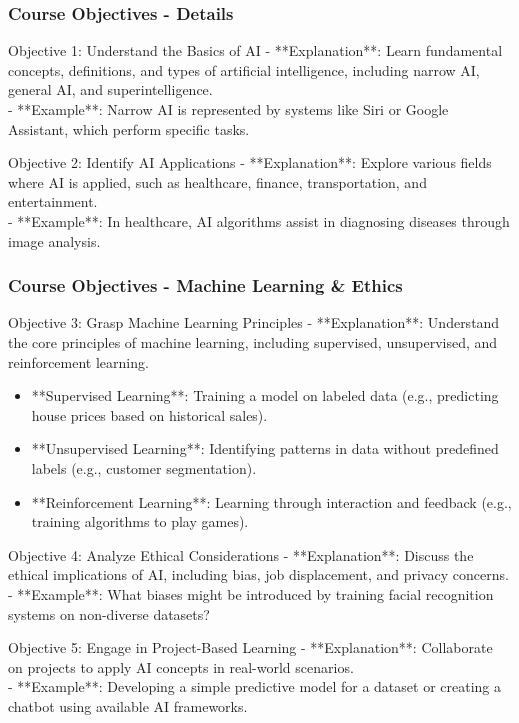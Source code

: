 \documentclass[aspectratio=169]{beamer}
\begin{document}
\begin{frame}[fragile]
    \frametitle{Course Objectives - Details}
    \begin{block}{Objective 1: Understand the Basics of AI}
        - **Explanation**: Learn fundamental concepts, definitions, and types of artificial intelligence, including narrow AI, general AI, and superintelligence. \\
        - **Example**: Narrow AI is represented by systems like Siri or Google Assistant, which perform specific tasks.
    \end{block}

    \begin{block}{Objective 2: Identify AI Applications}
        - **Explanation**: Explore various fields where AI is applied, such as healthcare, finance, transportation, and entertainment. \\
        - **Example**: In healthcare, AI algorithms assist in diagnosing diseases through image analysis.
    \end{block}
\end{frame}

\begin{frame}[fragile]
    \frametitle{Course Objectives - Machine Learning & Ethics}
    \begin{block}{Objective 3: Grasp Machine Learning Principles}
        - **Explanation**: Understand the core principles of machine learning, including supervised, unsupervised, and reinforcement learning. \\
        \begin{itemize}
            \item **Supervised Learning**: Training a model on labeled data (e.g., predicting house prices based on historical sales).
            \item **Unsupervised Learning**: Identifying patterns in data without predefined labels (e.g., customer segmentation).
            \item **Reinforcement Learning**: Learning through interaction and feedback (e.g., training algorithms to play games).
        \end{itemize}
    \end{block}

    \begin{block}{Objective 4: Analyze Ethical Considerations}
        - **Explanation**: Discuss the ethical implications of AI, including bias, job displacement, and privacy concerns. \\
        - **Example**: What biases might be introduced by training facial recognition systems on non-diverse datasets?
    \end{block}

    \begin{block}{Objective 5: Engage in Project-Based Learning}
        - **Explanation**: Collaborate on projects to apply AI concepts in real-world scenarios. \\
        - **Example**: Developing a simple predictive model for a dataset or creating a chatbot using available AI frameworks.
    \end{block}
\end{frame}
\end{document}
